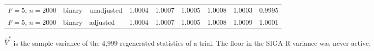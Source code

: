 \begin{table}[!htbp]
\begin{threeparttable}
\begin{singlespace}
\begin{tabular}{@{}lllllllll@{}}
$F=5$, $n=2000$ & binary & unadjusted & 1.0004 & 1.0007 & 1.0005 & 1.0008 & 1.0003 & 0.9995\\
$F=5$, $n=2000$ & binary & adjusted & 1.0004 & 1.0007 & 1.0005 & 1.0008 & 1.0009 & 1.0001\\
\bottomrule\end{tabular}
\begin{tablenotes}[flushleft]\small\item $\widehat V^{*}$ is the sample variance of the 4,999 regenerated statistics of a trial. The floor in the SIGA-R variance was never active.\end{tablenotes}
\end{singlespace}\end{threeparttable}\end{table}
